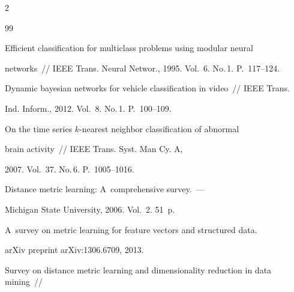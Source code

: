 \begin{multicols}{2}
{{\begin{thebibliography}{99}




Efficient classification for multiclass problems using modular neural


  networks~// IEEE Trans. Neural Networ., 1995. Vol.~6. No.\,1. P.~117--124.









Dynamic bayesian networks for vehicle classification in video~// IEEE Trans. 


Ind. Inform., 2012. Vol.~8. No.\,1. P.~100--109.









On the time series $k$-nearest neighbor classification of abnormal


  brain activity~// IEEE Trans. Syst. Man  Cy. A,


2007. Vol.~37. No.\,6. P.~1005--1016.









Distance metric learning: A~comprehensive survey.~--- 


Michigan State University, 2006. Vol.~2. 51~p.









A~survey on metric learning for feature vectors and structured data.


arXiv preprint arXiv:1306.6709, 2013.















Survey on distance metric learning and dimensionality reduction in data mining~//



\end{thebibliography}}}
\end{multicols}
